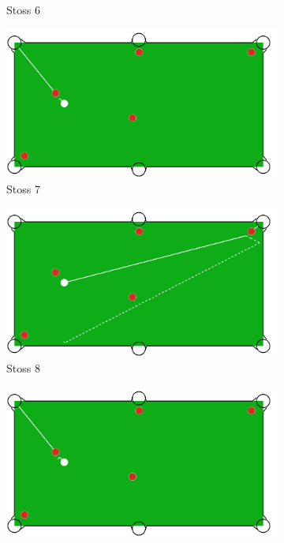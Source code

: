 \begin{figure}[h!]
\begin{subfigure}[b]{0.3\textwidth}
        \caption{Stoss 6}
        \label{fig:situation_velocity_1_solution_6}
    \end{subfigure}
    \hfill
    \begin{subfigure}[b]{0.3\textwidth}
        \centering
        \includegraphics[width=1.0\linewidth]{../common/04_results/resources/simple_search/situation_diverse_solution_velocity_7.PNG}
        \caption{Stoss 7}
        \label{fig:situation_velocity_1_solution_7}
    \end{subfigure}
    \hfill
    \begin{subfigure}[b]{0.3\textwidth}
        \centering
        \includegraphics[width=1.0\linewidth]{../common/04_results/resources/simple_search/situation_diverse_solution_velocity_8.PNG}
        \caption{Stoss 8}
        \label{fig:situation_velocity_1_solution_8}
    \end{subfigure}
    \hfill
    \begin{subfigure}[b]{0.3\textwidth}
        \centering
        \includegraphics[width=1.0\linewidth]{../common/04_results/resources/simple_search/situation_diverse_solution_velocity_9.PNG}

\end{subfigure}
\end{figure}
